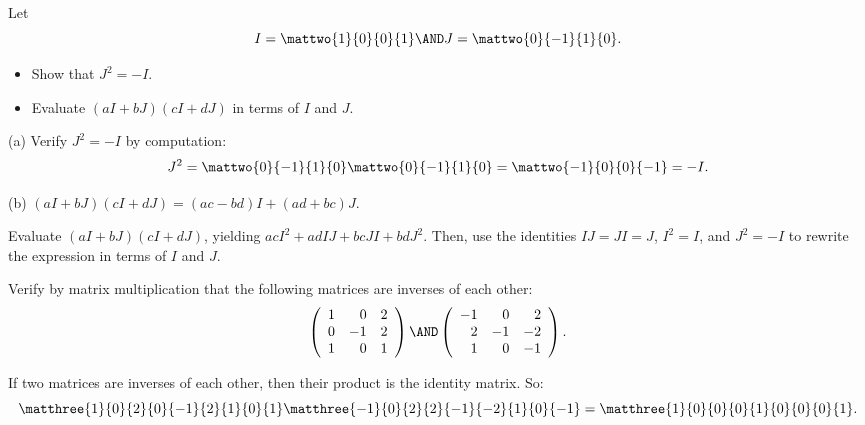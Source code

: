 \documentclass{article}
\begin{document}
\begin{exercise} \label{c4.7.5}
Let
\[
I = \mattwo{1}{0}{0}{1} \AND J =\mattwo{0}{-1}{1}{0}.
\]
\begin{itemize}
\item[(a)] Show that $J^2=-I$.
\item[(b)] Evaluate $(aI+bJ)(cI+dJ)$ in terms of $I$ and $J$.
\end{itemize}

\begin{solution}

(a) Verify $J^2 = -I$ by computation:
\[ J^2 = \mattwo{0}{-1}{1}{0}\mattwo{0}{-1}{1}{0} =
\mattwo{-1}{0}{0}{-1} = -I. \]

(b) \ans $(aI + bJ)(cI + dJ) = (ac - bd)I + (ad + bc)J$.

\soln Evaluate $(aI + bJ)(cI + dJ)$, yielding
$acI^2 + adIJ + bcJI + bdJ^2$.  Then, use the identities $IJ = JI = J$,
$I^2 = I$, and $J^2 = -I$ to rewrite the expression in terms of $I$
and $J$.

\end{solution}
\end{exercise}





\problemlabel

\begin{exercise} \label{c4.8.1}
Verify by matrix multiplication that the following matrices are inverses
of each other:
\[
\left( \begin{array}{rrr}
1  &  0  &  2\\
0  & -1  &  2\\
1  &  0  &  1
\end{array} \right)\AND
\left( \begin{array}{rrr}
-1 &   0 &   2\\
 2 &  -1 &  -2\\
 1 &   0 &  -1
\end{array} \right).
\]

\begin{solution}

If two matrices are inverses of each other, then their product is the
identity matrix.  So:
\[ \matthree{1}{0}{2}{0}{-1}{2}{1}{0}{1}
\matthree{-1}{0}{2}{2}{-1}{-2}{1}{0}{-1} =
\matthree{1}{0}{0}{0}{1}{0}{0}{0}{1}. \]

\end{solution}
\end{exercise}
\end{document}
